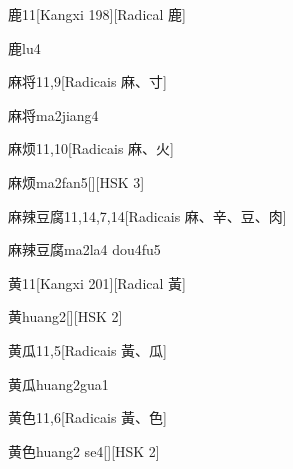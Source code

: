 \begin{entry}{鹿}{11}[Kangxi 198][Radical ⿅]
  \begin{phonetics}{鹿}{lu4}
  \end{phonetics}
\end{entry}

\begin{entry}{麻将}{11,9}[Radicais ⿇、⼨]
  \begin{phonetics}{麻将}{ma2jiang4}
  \end{phonetics}
\end{entry}

\begin{entry}{麻烦}{11,10}[Radicais ⿇、⽕]
  \begin{phonetics}{麻烦}{ma2fan5}[][HSK 3]
  \end{phonetics}
\end{entry}

\begin{entry}{麻辣豆腐}{11,14,7,14}[Radicais ⿇、⾟、⾖、⾁]
  \begin{phonetics}{麻辣豆腐}{ma2la4 dou4fu5}
  \end{phonetics}
\end{entry}

\begin{entry}{黄}{11}[Kangxi 201][Radical ⿈]
  \begin{phonetics}{黄}{huang2}[][HSK 2]
  \end{phonetics}
\end{entry}

\begin{entry}{黄瓜}{11,5}[Radicais ⿈、⽠]
  \begin{phonetics}{黄瓜}{huang2gua1}
  \end{phonetics}
\end{entry}

\begin{entry}{黄色}{11,6}[Radicais ⿈、⾊]
  \begin{phonetics}{黄色}{huang2 se4}[][HSK 2]
  \end{phonetics}
\end{entry}

